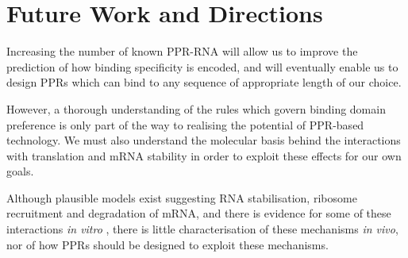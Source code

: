 \section{Future Work and Directions}

Increasing the number of known PPR-RNA will allow us to improve the prediction
of how binding specificity is encoded, and will eventually enable us to design
PPRs which can bind to any sequence of appropriate length of our choice.

However, a thorough understanding of the rules which govern binding domain 
preference is
only part of the way to realising the potential of PPR-based technology.
We must also understand the molecular basis behind the interactions with
translation and mRNA stability in order to exploit these effects for our own
goals.

Although plausible models exist suggesting RNA stabilisation, ribosome 
recruitment and degradation of mRNA, and there is evidence for some of 
these interactions
\emph{in vitro} \citep[see][]{Prikryl2011}, there is little characterisation of
these mechanisms \emph{in vivo}, nor of how PPRs should
be designed to exploit these mechanisms.

